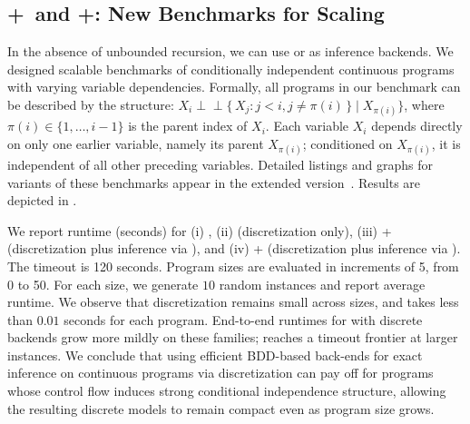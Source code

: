 \subsection{\Slicebf+\Dicebf~and \Slicebf+\Roulettebf: New Benchmarks for Scaling}\label{sec:synthetic-benchmarks} 
In the absence of unbounded recursion, we can use \Dice or \Roulette as inference backends.
We designed scalable benchmarks of conditionally independent continuous programs with varying variable dependencies. Formally, all programs in our benchmark can be described by the structure: $X_i \perp\!\!\!\perp \{\,X_j : j < i, j \neq \pi(i)\,\}
\;\Big|\; X_{\pi(i)}\}$, where $\pi(i) \in \{1, \ldots, i-1\}$ is the parent index of $X_i$. Each variable $X_i$ depends directly on only one earlier variable, namely its parent $X_{\pi(i)}$; conditioned on $X_{\pi(i)}$, it is independent of all other preceding variables. Detailed listings and graphs for variants of these benchmarks appear in the extended version~\cite[\S~G.1.1]{Wu2026SliceExtended}. Results are depicted in .

We report runtime (seconds) for (i) \SPPL{}, (ii) \Slice{} (discretization only), (iii) \Slice{}+\Dice{} (discretization plus inference via \Dice{}), and (iv) \Slice{}+\Roulette{} (discretization plus inference via \Roulette{}). The timeout is 120 seconds. Program sizes are evaluated in increments of 5, from 0 to 50. For each size, we generate $10$ random instances and report average runtime. We observe that discretization remains small across sizes, and takes less than $0.01$ seconds for each program. End-to-end runtimes for \Slice{} with discrete backends grow more mildly on these families; \SPPL reaches a timeout frontier at larger instances. We conclude that using efficient BDD-based back-ends for exact inference on continuous programs via discretization can pay off for programs whose control flow induces strong conditional independence structure, allowing the resulting discrete models to remain compact even as program size grows.
 



